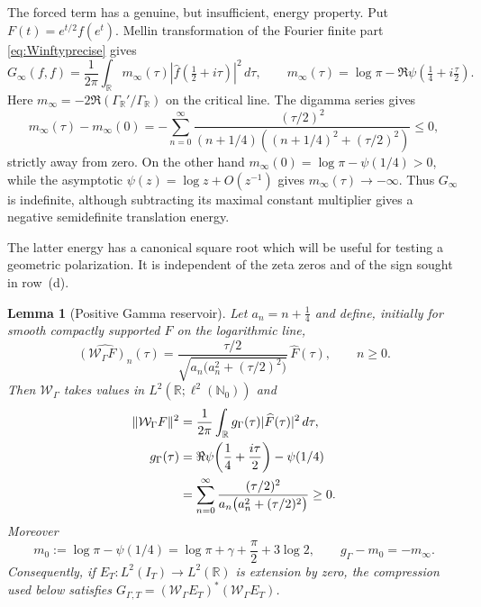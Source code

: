 \documentclass[11pt]{amsart}
\newtheorem{lemma}[theorem]{Lemma}
\theoremstyle{definition}
\theoremstyle{remark}
\begin{document}
The forced term has a genuine, but insufficient, energy property.  Put
$F(t)=e^{t/2}f(e^t)$.  Mellin transformation of the Fourier finite part
\eqref{eq:Winftyprecise} gives
\begin{equation}\label{eq:archmultiplier}
 G_\infty(f,f)=\frac1{2\pi}\int_{\mathbb R}m_\infty(\tau)
 |\widehat f(\tfrac12+i\tau)|^2\,d\tau,\qquad
 m_\infty(\tau)=\log\pi-\Re\psi(\tfrac14+i\tfrac\tau2).
\end{equation}
Here $m_\infty=-2\Re(\Gamma_{\mathbb R}'/\Gamma_{\mathbb R})$ on the
critical line.  The digamma series gives
\begin{equation}\label{eq:archenergy}
 m_\infty(\tau)-m_\infty(0)
 =-\sum_{n=0}^\infty
 \frac{(\tau/2)^2}
 {(n+1/4)((n+1/4)^2+(\tau/2)^2)}\le0,
\end{equation}
strictly away from zero.  On the other hand
$m_\infty(0)=\log\pi-\psi(1/4)>0$, while the asymptotic
$\psi(z)=\log z+O(z^{-1})$ gives $m_\infty(\tau)\to-\infty$.
Thus $G_\infty$ is indefinite, although subtracting its maximal constant
multiplier gives a negative semidefinite translation energy.

The latter energy has a canonical square root which will be useful for
testing a geometric polarization.  It is independent of the zeta zeros and
of the sign sought in row~(d).

\begin{lemma}[Positive Gamma reservoir]
\label{lem:positiveGammaReservoir}
Let $a_n=n+\frac14$ and define, initially for smooth compactly supported
$F$ on the logarithmic line,
\begin{equation}\label{eq:GammaReservoirMap}
 \widehat{(\mathcal W_\Gamma F)_n}(\tau)
 =\frac{\tau/2}{
 \sqrt{a_n\bigl(a_n^2+(\tau/2)^2\bigr)}}\,\widehat F(\tau),
 \qquad n\ge0.
\end{equation}
Then $\mathcal W_\Gamma$ takes values in
$L^2(\mathbb R;\ell^2(\mathbb N_0))$ and
\begin{align}
 \|\mathcal W_\Gamma F\|^2
 &=\frac1{2\pi}\int_{\mathbb R}g_\Gamma(\tau)
       |\widehat F(\tau)|^2\,d\tau,\label{eq:GammaReservoirGram}\\
 g_\Gamma(\tau)
 &=\Re\psi\!\left(\frac14+\frac{i\tau}{2}\right)-\psi(1/4)
 \notag\\
 &=\sum_{n=0}^\infty
 \frac{(\tau/2)^2}
 {a_n\bigl(a_n^2+(\tau/2)^2\bigr)}\ge0.\notag
\end{align}
Moreover
\begin{equation}\label{eq:GammaReservoirConstant}
 m_0:=\log\pi-\psi(1/4)
 =\log\pi+\gamma+\frac\pi2+3\log2,
 \qquad g_\Gamma-m_0=-m_\infty.
\end{equation}
Consequently, if $E_T:L^2(I_T)\to L^2(\mathbb R)$ is extension by zero, the
compression used below satisfies
$G_{\Gamma,T}=(\mathcal W_\Gamma E_T)^*(\mathcal W_\Gamma E_T)$.
\end{lemma}
\end{document}
